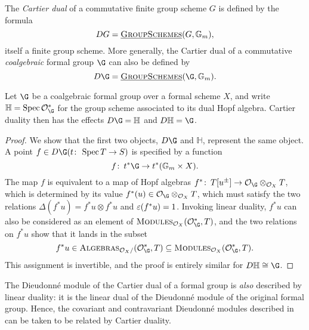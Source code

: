 \begin{definition}\label{DefnCartierDual}
The \textit{Cartier dual} of a commutative finite group scheme \(G\) is defined by the formula \[DG = \operatorname{\underline{\smash{\normalfont\textsc{GroupSchemes}}}}(G, \mathbb G_m),\] itself a finite group scheme.  More generally, the Cartier dual of a commutative \emph{coalgebraic} formal group \(\G\) can also be defined by \[D\G = \InternalHom{GroupSchemes}(\G, \Gm).\]
\end{definition}

\begin{lemma}
Let \(\G\) be a coalgebraic formal group over a formal scheme \(X\), and write \(\mathbb H = \Spec \sheaf O_{\G}^*\) for the group scheme associated to its dual Hopf algebra.  Cartier duality then has the effects \(D\G = \mathbb H\) and \(D\mathbb H = \G\).
\end{lemma}
\begin{proof}
We show that the first two objects, \(D\G\) and \(\mathbb H\), represent the same object.  A point \(f \in D\G(t\co \Spec T \to S)\) is specified by a function \[f\co t^* \G \to t^*(\Gm \times X).\]  The map \(f\) is equivalent to a map of Hopf algebras \(f^*\co T[u^\pm] \to \sheaf O_{\G} \otimes_{\sheaf O_X} T\), which is determined by its value \(f^*(u) \in \sheaf O_{\G} \otimes_{\sheaf O_X} T\), which must satisfy the two relations \(\Delta(f^* u) = f^* u \otimes f^* u\) and \(\varepsilon(f^* u) = 1\).  Invoking linear duality, \(f^* u\) can also be considered as an element of \(\CatOf{Modules}_{\sheaf O_X}(\sheaf O_{\G}^*, T)\), and the two relations on \(f^* u\) show that it lands in the subset \[f^* u \in \CatOf{Algebras}_{\sheaf O_X /}(\sheaf O_{\G}^*, T) \subseteq \CatOf{Modules}_{\sheaf O_X}(\sheaf O_{\G}^*, T).\]  This assignment is invertible, and the proof is entirely similar for \(D \mathbb H \cong \G\).
\end{proof}

\begin{remark}
The Dieudonn\'e module of the Cartier dual of a formal group is \emph{also} described by linear duality: it is the linear dual of the Dieudonn\'e module of the original formal group.  Hence, the covariant and contravariant Dieudonn\'e modules described in  can be taken to be related by Cartier duality.
\end{remark}

